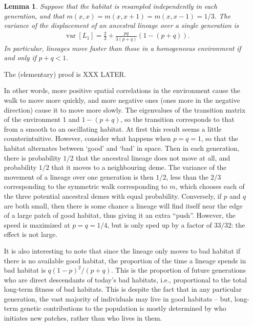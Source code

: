 \documentclass{article}
\DeclareMathOperator{\var}{var}
\newtheorem{lemma}{Lemma}
\begin{document}
\begin{lemma}
    Suppose that the habitat is resampled independently in each generation,
    and that $m(x,x) = m(x,x+1) = m(x,x-1) = 1/3$.
    The variance of the displacement of an ancestral lineage over a single generation is 
    $$\begin{aligned}
        \var[L_1] = \frac{2}{3} + \frac{pq}{3(p+q)}\left(1 - (p+q)\right) .
    \end{aligned}$$
    In particular, lineages move faster than those in a homogeneous environment
    if and only if $p+q < 1$.
\end{lemma}

The (elementary) proof is XXX LATER.

In other words, 
more positive spatial correlations in the environment cause the walk to move more quickly, 
and more negative ones (ones more in the negative direction) 
cause it to move more slowly. 
The eigenvalues of the transition matrix of the environment 1 and $1 - (p + q)$, 
so the transition corresponds to that from a smooth to an oscillating habitat.
At first this result seems a little counterintuitive. 
However, consider what happens when $p = q = 1$, 
so that the habitat alternates between `good' and `bad' in space. 
Then in each generation, 
there is probability $1/2$ that the ancestral lineage does not move at all, 
and probability $1/2$ that it moves to a neighbouring deme. 
The variance of the movement of a lineage over one generation is then $1/2$, 
less than the $2/3$ corresponding to the symmetric walk corresponding to $m$, 
which chooses each of the three potential ancestral demes with equal probability.
Conversely, if $p$ and $q$ are both small, then there is some chance a lineage will find itself
near the edge of a large patch of good habitat, thus giving it an extra ``push''.
However, the speed is maximized at $p=q=1/4$, but is only sped up by a factor of $33/32$:
the effect is not large.



It is also interesting to note that since the lineage only moves to bad habitat
if there is no available good habitat,
the proportion of the time a lineage spends in bad habitat is $q(1-p)^2/(p+q)$.
This is the proportion of future generations who are direct descendants of today's bad habitats,
i.e., proportional to the total long-term fitness of bad habitats.
This is despite the fact that in any particular generation, the vast majority of individuals
may live in good habitats --
but, long-term genetic contributions to the population
is mostly determined by who initiates new patches, rather than who lives in them.
\end{document}
